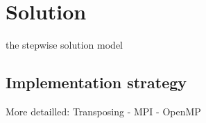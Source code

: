 \section{Solution}
the stepwise solution model

\subsection{Implementation strategy}
More detailled: Transposing - MPI - OpenMP
